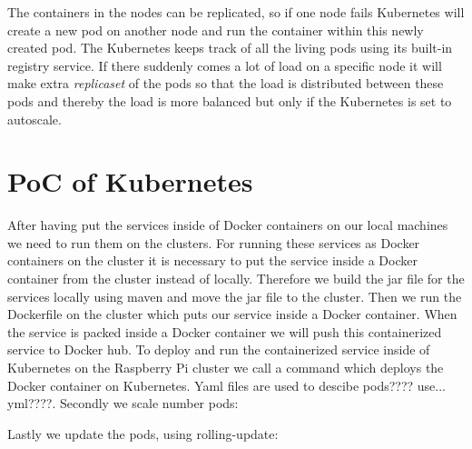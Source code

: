 The containers in the nodes can be replicated, so if one node fails Kubernetes will create a new pod on another node and run the container within this newly created pod. The Kubernetes keeps track of all the living pods using its built-in registry service.  
If there suddenly comes a lot of load on a specific node it will make extra \emph{replicaset} of the pods so that the load is distributed between these pods and thereby the load is more balanced but only if the Kubernetes is set to autoscale. 

\section{PoC of Kubernetes}
After having put the services inside of Docker containers on our local machines we need to run them on the clusters. For running these services as Docker containers on the cluster it is necessary to put the service inside a Docker container from the cluster instead of locally. Therefore we build the jar file for the services locally using maven and move the jar file to the cluster. Then we run the Dockerfile on the cluster which puts our service inside a Docker container. When the service is packed inside a Docker container we will push this containerized service to Docker hub. To deploy and run the containerized service inside of Kubernetes on the Raspberry Pi cluster we call a command which deploys the Docker container on Kubernetes. Yaml files are used to descibe pods???? use... yml????.
Secondly we scale number pods:

Lastly we update the pods, using rolling-update:





